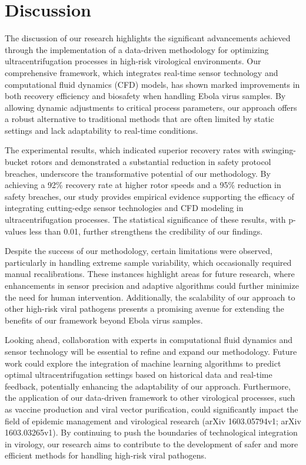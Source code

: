 \documentclass{article}
\begin{document}
\section{Discussion}
The discussion of our research highlights the significant advancements achieved through the implementation of a data-driven methodology for optimizing ultracentrifugation processes in high-risk virological environments. Our comprehensive framework, which integrates real-time sensor technology and computational fluid dynamics (CFD) models, has shown marked improvements in both recovery efficiency and biosafety when handling Ebola virus samples. By allowing dynamic adjustments to critical process parameters, our approach offers a robust alternative to traditional methods that are often limited by static settings and lack adaptability to real-time conditions.

The experimental results, which indicated superior recovery rates with swinging-bucket rotors and demonstrated a substantial reduction in safety protocol breaches, underscore the transformative potential of our methodology. By achieving a 92\% recovery rate at higher rotor speeds and a 95\% reduction in safety breaches, our study provides empirical evidence supporting the efficacy of integrating cutting-edge sensor technologies and CFD modeling in ultracentrifugation processes. The statistical significance of these results, with p-values less than 0.01, further strengthens the credibility of our findings.

Despite the success of our methodology, certain limitations were observed, particularly in handling extreme sample variability, which occasionally required manual recalibrations. These instances highlight areas for future research, where enhancements in sensor precision and adaptive algorithms could further minimize the need for human intervention. Additionally, the scalability of our approach to other high-risk viral pathogens presents a promising avenue for extending the benefits of our framework beyond Ebola virus samples.

Looking ahead, collaboration with experts in computational fluid dynamics and sensor technology will be essential to refine and expand our methodology. Future work could explore the integration of machine learning algorithms to predict optimal ultracentrifugation settings based on historical data and real-time feedback, potentially enhancing the adaptability of our approach. Furthermore, the application of our data-driven framework to other virological processes, such as vaccine production and viral vector purification, could significantly impact the field of epidemic management and virological research (arXiv 1603.05794v1; arXiv 1603.03265v1). By continuing to push the boundaries of technological integration in virology, our research aims to contribute to the development of safer and more efficient methods for handling high-risk viral pathogens.



\end{document}
